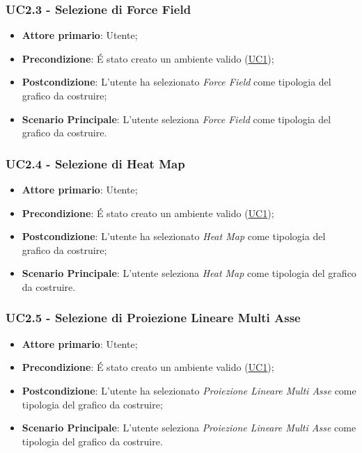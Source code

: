\subsubsection{UC2.3 - Selezione di Force Field}
\label{ssub:uc2.3}
\begin{itemize}

    \item \textbf{Attore primario}: Utente;

    \item \textbf{Precondizione}:   É stato creato un ambiente valido (\hyperref[sub:uc1]{UC1});

    \item \textbf{Postcondizione}:  L'utente ha selezionato \emph{Force Field} come tipologia del grafico da 
	costruire;
	
	\item \textbf{Scenario Principale}: L'utente seleziona \emph{Force Field} come tipologia del grafico da costruire.

\end{itemize}


\subsubsection{UC2.4 - Selezione di Heat Map}
\label{ssub:uc2.4}
\begin{itemize}

    \item \textbf{Attore primario}: Utente;

	\item \textbf{Precondizione}:   É stato creato un ambiente valido (\hyperref[sub:uc1]{UC1});

    \item \textbf{Postcondizione}:  L'utente ha selezionato \emph{Heat Map} come tipologia del grafico da 
	costruire;

	\item \textbf{Scenario Principale}: L'utente seleziona \emph{Heat Map} come tipologia del grafico da costruire.

\end{itemize}


\subsubsection{UC2.5 - Selezione di Proiezione Lineare Multi Asse}
\label{ssub:uc2.5}
\begin{itemize}

    \item \textbf{Attore primario}: Utente;

    \item \textbf{Precondizione}:   É stato creato un ambiente valido (\hyperref[sub:uc1]{UC1});

	\item \textbf{Postcondizione}:  L'utente ha selezionato \emph{Proiezione Lineare Multi Asse} come tipologia del 
	grafico da costruire;
	
	\item \textbf{Scenario Principale}: L'utente seleziona \emph{Proiezione Lineare Multi Asse} come tipologia del 
	grafico da costruire.
\end{itemize}

